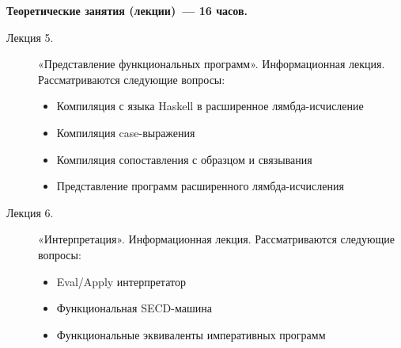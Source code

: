 {\parindent0pt

\textbf{Теоретические занятия (лекции)~— 16 часов.}
\begin{description}
\item[Лекция 5.] «Представление функциональных программ». Информационная лекция. Рассматриваются следующие вопросы: \begin{itemize}
\item Компиляция с языка Haskell в расширенное лямбда-исчисление\item Компиляция case-выражения\item Компиляция сопоставления с образцом и связывания\item Представление программ расширенного лямбда-исчисления
\end{itemize}\item[Лекция 6.] «Интерпретация». Информационная лекция. Рассматриваются следующие вопросы: \begin{itemize}
\item Eval/Apply интерпретатор\item Функциональная SECD-машина\item Функциональные эквиваленты императивных программ
\end{itemize}
\end{description}




}
